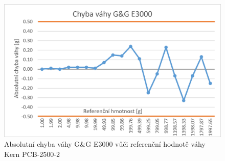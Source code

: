 
\begin{figure}[H]
    \begin{center}
        \includegraphics[scale=1.15]{obrazky/presnost_vahy.png}
    \end{center}
    \caption{Absolutní chyba váhy G\&G E3000 vůči referenční hodnotě váhy Kern PCB-2500-2}
    \label{obr:presnost_vahy}
\end{figure}

